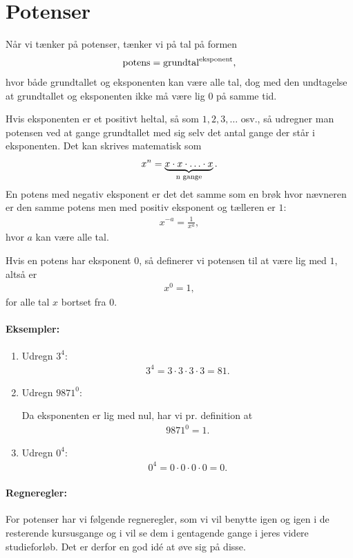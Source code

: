 \section{Potenser}
\noindent Når vi tænker på potenser, tænker vi på tal på formen
\begin{align*}
\textup{potens} = \textup{grundtal}^{\textup{eksponent}},
\end{align*}
hvor både grundtallet og eksponenten kan være alle tal, dog med den undtagelse at grundtallet og eksponenten ikke må være lig $0$ på samme tid.

Hvis eksponenten er et positivt heltal, så som $1,2,3,\ldots$ osv., så udregner man potensen ved at gange grundtallet med sig selv det antal gange der står i eksponenten. Det kan skrives matematisk som
\begin{align*}
x^n = \underbrace{x \cdot x \cdot \ldots \cdot x}_{\textup{n gange}}.
\end{align*}
En potens med negativ eksponent er det det samme som en brøk hvor nævneren er den samme potens men med positiv eksponent og tælleren er $1$:
\begin{align*}
x^{-a} = \frac{1}{x^a},
\end{align*} 
hvor $a$ kan være alle tal.

Hvis en potens har eksponent $0$, så definerer vi potensen til at være lig med $1$, altså er
\begin{align*}
x^0=1,
\end{align*}
for alle tal $x$ bortset fra $0$.
\paragraph{Eksempler:}
\begin{enumerate}
\item Udregn $3^4$:
\begin{align*}
3^4=3\cdot 3 \cdot 3 \cdot 3 = 81. 
\end{align*}
\item Udregn $9871^0$:

Da eksponenten er lig med nul, har vi pr. definition at
\begin{align*}
9871^0=1.
\end{align*}
\item Udregn $0^4$:
\begin{align*}
0^4 = 0 \cdot 0 \cdot 0 \cdot 0 = 0.
\end{align*}
\end{enumerate}
\paragraph*{Regneregler:}
For potenser har vi følgende regneregler, som vi vil benytte igen og igen i de resterende kursusgange og i vil se dem i gentagende gange i jeres videre studieforløb. Det er derfor en god idé at øve sig på disse.

